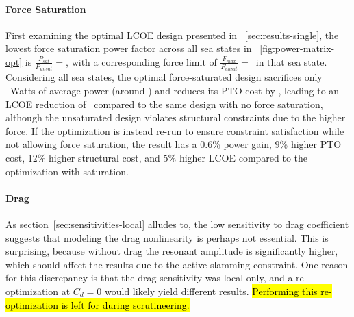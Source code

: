 \paragraph{Force Saturation}
First examining the optimal LCOE design presented in \sectionautorefname~\ref{sec:results-single}, the lowest force saturation power factor across all sea states in \figureautorefname~\ref{fig:power-matrix-opt} is $\frac{P_{sat}}{P_{unsat}}=$\lowestFmaxFactorMinLCOE, with a corresponding force limit of $\frac{F_{max}}{F_{unsat}}=$\lowestFsatMinLCOE~in that sea state. 
Considering all sea states, the optimal force-saturated design sacrifices only \powerLossForceSatMinLCOE~Watts of average power (around \pctPowerLossForceSatMinLCOE) and reduces its PTO cost by \pctPTOSavingsForceSatMinLCOE, leading to an LCOE reduction of \pctImproveLCOEForceSatMinLCOE~compared to the same design with no force saturation, although the unsaturated design violates structural constraints due to the higher force. If the optimization is instead re-run to ensure constraint satisfaction while not allowing force saturation, the result has a 0.6\% power gain, 9\% higher PTO cost, 12\% higher structural cost, and 5\% higher LCOE compared to the optimization with saturation.

\paragraph{Drag}
As section~\ref{sec:sensitivities-local} alludes to, the low sensitivity to drag coefficient suggests that modeling the drag nonlinearity is perhaps not essential. This is surprising, because without drag the resonant amplitude is significantly higher, which should affect the results due to the active slamming constraint. One reason for this discrepancy is that the drag sensitivity was local only, and a re-optimization at $C_d=0$ would likely yield different results.
\hl{Performing this re-optimization is left for during scrutineering.}

